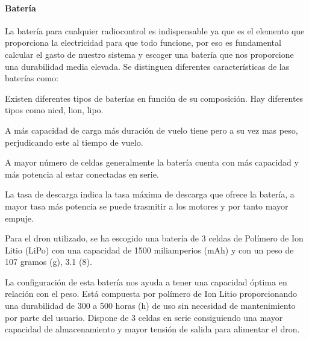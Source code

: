 \paragraph{Batería}
\label{SSS:Bateria}

 La batería para cualquier radiocontrol es indispensable ya que es el elemento que proporciona la electricidad para que todo funcione, por eso es fundamental calcular el gasto de nuestro sistema y escoger una batería que nos proporcione una durabilidad media elevada.
 Se distinguen diferentes características de las baterías como:
 
 \begin{description}
 \item[Composición: ]  Existen diferentes tipos de baterías en función de su composición. Hay diferentes tipos como \acl{nicd}, \acl{lion}, \acl{lipo}.
 \item[Capacidad: ] A más capacidad de carga más duración de vuelo tiene pero a su vez mas peso, perjudicando este al tiempo de vuelo.
 \item[Número de celdas: ] A mayor número de celdas generalmente la batería cuenta con más capacidad y más potencia al estar conectadas en serie.
 \item[Tasa de descarga: ] La tasa de descarga indica la tasa máxima de descarga que ofrece la batería, a mayor tasa más potencia se puede trasmitir a los motores y por tanto mayor empuje. 
 \end{description}

Para el dron utilizado, se ha escogido una batería de 3 celdas de Polímero de Ion Litio (LiPo) con una capacidad de 1500 miliamperios (mAh) y con un peso de 107 gramos (g), 3.1 (8). 


La configuración de esta batería nos ayuda a tener una capacidad óptima en relación con el peso. 
Está compuesta por polímero de Ion Litio proporcionando una durabilidad de 300 a 500 horas (h) de uso sin necesidad de mantenimiento por parte del usuario. 
Dispone de 3 celdas en serie consiguiendo una mayor capacidad de almacenamiento y mayor tensión de salida para alimentar el dron.


	

